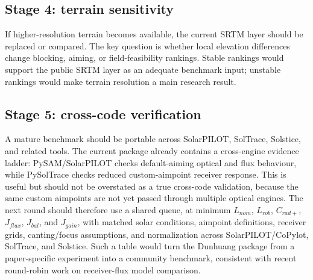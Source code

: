 \documentclass[final,3p,times]{elsarticle}
\begin{document}
\subsection{Stage 4: terrain sensitivity}
If higher-resolution terrain becomes available, the current SRTM layer should be replaced or compared. The key question is whether local elevation differences change blocking, aiming, or field-feasibility rankings. Stable rankings would support the public SRTM layer as an adequate benchmark input; unstable rankings would make terrain resolution a main research result.

\subsection{Stage 5: cross-code verification}
A mature benchmark should be portable across SolarPILOT, SolTrace, Solstice, and related tools. The current package already contains a cross-engine evidence ladder: PySAM/SolarPILOT checks default-aiming optical and flux behaviour, while PySolTrace checks reduced custom-aimpoint receiver response. This is useful but should not be overstated as a true cross-code validation, because the same custom aimpoints are not yet passed through multiple optical engines. The next round should therefore use a shared queue, at minimum $L_{nom}$, $L_{rob}$, $C_{rad+}$, $J_{flux}$, $J_{bal}$, and $J_{gain}$, with matched solar conditions, aimpoint definitions, receiver grids, canting/focus assumptions, and normalization across SolarPILOT/CoPylot, SolTrace, and Solstice. Such a table would turn the Dunhuang package from a paper-specific experiment into a community benchmark, consistent with recent round-robin work on receiver-flux model comparison.
\end{document}
